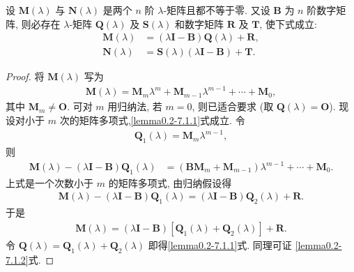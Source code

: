 \documentclass[../../main.tex]{subfiles}
\begin{document}
\begin{lemma}\label{lemma:lambda-矩阵的性质1}
设 $\boldsymbol{M}(\lambda)$ 与 $\boldsymbol{N}(\lambda)$ 是两个 $n$ 阶 $\lambda$-矩阵且都不等于零. 又设 $\boldsymbol{B}$ 为 $n$ 阶数字矩阵, 则必存在 $\lambda$-矩阵 $\boldsymbol{Q}(\lambda)$ 及 $\boldsymbol{S}(\lambda)$ 和数字矩阵 $\boldsymbol{R}$ 及 $\boldsymbol{T}$, 使下式成立:
\begin{align}
\boldsymbol{M}(\lambda)&=(\lambda\boldsymbol{I}-\boldsymbol{B})\boldsymbol{Q}(\lambda)+\boldsymbol{R}, \label{lemma0.2-7.1.1}\\
\boldsymbol{N}(\lambda)&=\boldsymbol{S}(\lambda)(\lambda\boldsymbol{I}-\boldsymbol{B})+\boldsymbol{T}. \label{lemma0.2-7.1.2}
\end{align}
\end{lemma}
\begin{proof}
将 $\boldsymbol{M}(\lambda)$ 写为
\begin{align*}
\boldsymbol{M}(\lambda)=\boldsymbol{M}_m\lambda^m+\boldsymbol{M}_{m - 1}\lambda^{m - 1}+\cdots+\boldsymbol{M}_0,
\end{align*}
其中 $\boldsymbol{M}_m\neq\boldsymbol{O}$. 可对 $m$ 用归纳法, 若 $m = 0$, 则已适合要求 (取 $\boldsymbol{Q}(\lambda)=\boldsymbol{O}$). 现设对小于 $m$ 次的矩阵多项式,\eqref{lemma0.2-7.1.1}式成立. 令
\begin{align*}
\boldsymbol{Q}_1(\lambda)=\boldsymbol{M}_m\lambda^{m - 1},
\end{align*}
则
\begin{align}
\boldsymbol{M}(\lambda)-(\lambda\boldsymbol{I}-\boldsymbol{B})\boldsymbol{Q}_1(\lambda)&=(\boldsymbol{B}\boldsymbol{M}_m+\boldsymbol{M}_{m - 1})\lambda^{m - 1}+\cdots+\boldsymbol{M}_0. \label{lemma0.2-7.1.3}
\end{align}
上式是一个次数小于 $m$ 的矩阵多项式, 由归纳假设得
\begin{align*}
\boldsymbol{M}(\lambda)-(\lambda\boldsymbol{I}-\boldsymbol{B})\boldsymbol{Q}_1(\lambda)=(\lambda\boldsymbol{I}-\boldsymbol{B})\boldsymbol{Q}_2(\lambda)+\boldsymbol{R}.
\end{align*}
于是
\begin{align*}
\boldsymbol{M}(\lambda)=(\lambda\boldsymbol{I}-\boldsymbol{B})[\boldsymbol{Q}_1(\lambda)+\boldsymbol{Q}_2(\lambda)]+\boldsymbol{R}.
\end{align*}
令 $\boldsymbol{Q}(\lambda)=\boldsymbol{Q}_1(\lambda)+\boldsymbol{Q}_2(\lambda)$ 即得\eqref{lemma0.2-7.1.1}式. 同理可证 \eqref{lemma0.2-7.1.2}式. 
\end{proof}
\end{document}
